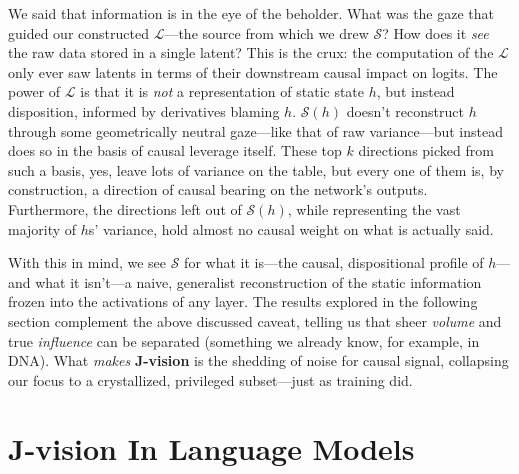 \documentclass{article}
\newcommand{\jlens}{\mathscr{L}}
\newcommand{\jspace}{\mathscr{S}}
\begin{document}
We said that information is in the eye of the beholder. What was the gaze that guided our constructed \(\jlens\)---the source from which we drew \(\jspace\)? How does it \textit{see} the raw data stored in a single latent? This is the crux: the computation of the \(\jlens\) only ever saw latents in terms of their downstream causal impact on logits. The power of \(\jlens\) is that it is \textit{not} a representation of static state \(h\), but instead disposition, informed by derivatives blaming \(h\). \(\jspace(h)\) doesn't reconstruct \(h\) through some geometrically neutral gaze---like that of raw variance---but instead does so in the basis of causal leverage itself. These top \(k\) directions picked from such a basis, yes, leave lots of variance on the table, but every one of them is, by construction, a direction of causal bearing on the network's outputs. Furthermore, the directions left out of \(\jspace(h)\), while representing the vast majority of \(h\)s' variance, hold almost no causal weight on what is actually said.

With this in mind, we see \(\jspace\) for what it is---the causal, dispositional profile of \(h\)---and what it isn't---a naive, generalist reconstruction of the static information frozen into the activations of any layer. The results explored in the following section complement the above discussed caveat, telling us that sheer \textit{volume} and true \textit{influence} can be separated (something we already know, for example, in DNA). What \textit{makes} \textbf{J-vision} is the shedding of noise for causal signal, collapsing our focus to a crystallized, privileged subset---just as training did.



\section{J-vision In Language Models}\label{jvizllm}
\end{document}
